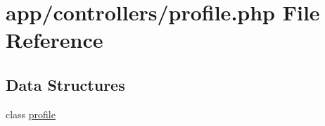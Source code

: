 \hypertarget{controllers_2profile_8php}{}\section{app/controllers/profile.php File Reference}
\label{controllers_2profile_8php}
\subsection*{Data Structures}
\begin{DoxyCompactItemize}
\item 
class \hyperlink{classprofile}{profile}
\end{DoxyCompactItemize}
